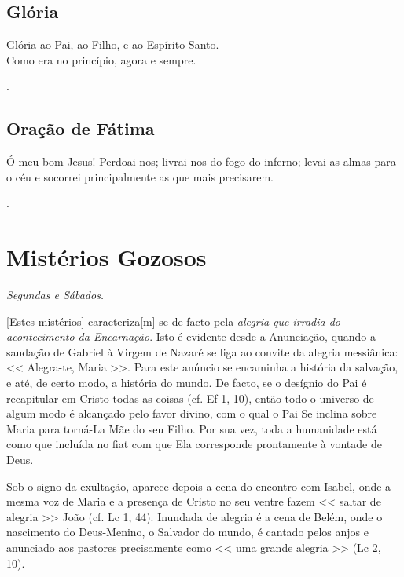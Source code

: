 \documentclass{rosario}
\begin{document}

\section{Glória}

Glória ao Pai, ao Filho, e ao Espírito Santo. \\
Como era no princípio, agora e sempre.

\amen.


\section{Oração de Fátima}

Ó meu bom Jesus!
Perdoai-nos;
livrai-nos do fogo do inferno;
levai as almas para o céu
e socorrei principalmente as que mais precisarem.

\amen.


\chapter{Mistérios Gozosos}

\emph{Segundas e Sábados.}


[Estes mistérios] caracteriza[m]-se de facto pela \emph{alegria que irradia do acontecimento da Encarnação}.
Isto é evidente desde a Anunciação, quando a saudação de Gabriel à Virgem de Nazaré se liga ao convite da alegria messiânica:
<< Alegra-te, Maria >>.
Para este anúncio se encaminha a história da salvação, e até, de certo modo, a história do mundo.
De facto, se o desígnio do Pai é recapitular em Cristo todas as coisas (cf. Ef 1, 10), então todo o
universo de algum modo é alcançado pelo favor divino, com o qual o Pai Se inclina sobre Maria
para torná-La Mãe do seu Filho.
Por sua vez, toda a humanidade está como que incluída no fiat com que Ela corresponde prontamente à vontade de Deus.

Sob o signo da exultação, aparece depois a cena do encontro com Isabel, onde a mesma voz de Maria e a presença de Cristo no seu ventre fazem << saltar de alegria >> João (cf. Lc 1, 44).
Inundada de alegria é a cena de Belém, onde o nascimento do Deus-Menino, o Salvador do mundo, é cantado pelos anjos e anunciado aos pastores precisamente como << uma grande alegria >> (Lc 2, 10).
\end{document}
